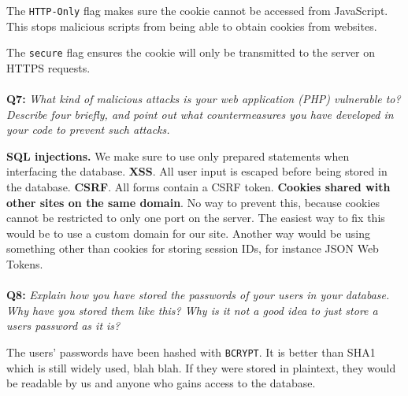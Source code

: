 The \verb/HTTP-Only/ flag makes sure the cookie cannot be accessed from JavaScript. This stops malicious scripts from being able to obtain cookies from websites.

The \verb/secure/ flag ensures the cookie will only be transmitted to the server on HTTPS requests.

\paragraph{}
\textbf{Q7:}
\textit{What kind of malicious attacks is your web application (PHP) vulnerable to? Describe four briefly, and point out what countermeasures you have developed in your code to prevent such attacks.}

\textbf{SQL injections.} We make sure to use only prepared statements when interfacing the database.
\textbf{XSS}. All user input is escaped before being stored in the database.
\textbf{CSRF}. All forms contain a CSRF token.
\textbf{Cookies shared with other sites on the same domain}. No way to prevent this, because cookies cannot be restricted to only one port on the server.
The easiest way to fix this would be to use a custom domain for our site.
Another way would be using something other than cookies for storing session IDs, for instance JSON Web Tokens.

\paragraph{}
\textbf{Q8:}
\textit{Explain how you have stored the passwords of your users in your database. Why have you stored them like this? Why is it not a good idea to just store a users password as it is?}

The users' passwords have been hashed with \verb/BCRYPT/.
It is better than SHA1 which is still widely used, blah blah.
If they were stored in plaintext, they would be readable by us and anyone who gains access to the database.
